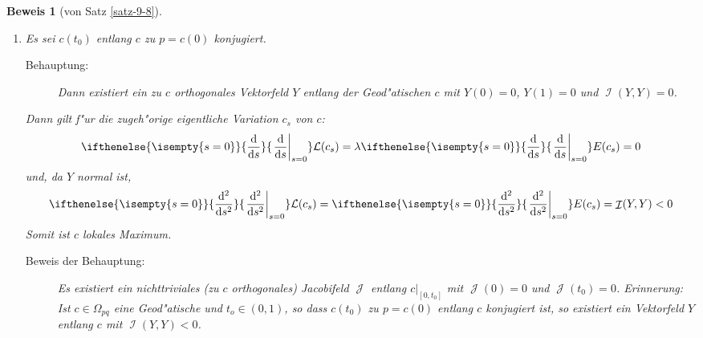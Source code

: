 \documentclass[paper=A4, twoside, chapterprefix=true, bibliography=totoc, headsepline]{scrbook}
\let\temp\phi{}
\let\phi\varphi{}
\let\varphi\temp{}
\let\temp\theta{}
\let\theta\vartheta{}
\let\vartheta\temp{}
\let\temp\epsilon{}
\let\epsilon\varepsilon{}
\let\varepsilon\temp{}
\let\temp\rho{}
\let\rho\varrho{}
\let\varrho\temp{}
\DeclareMathOperator{\calI}{\mathcal{I}}
\DeclareMathOperator{\calJ}{\mathcal{J}}
\newcommand{\dop}{\mathrm{d}}
\newcommand{\X}{\times}
\newcommand{\difffrac}[3][]{\ifthenelse{\isempty{#1}}{\frac{\dop #2}{\dop #3}}{\left. \frac{\dop #2}{\dop #3} \right|_{#1}}}
\theoremstyle{plain}
\theoremstyle{nonumberplain}
\newtheorem{bew}{Beweis}
\theoremstyle{empty}
\theoremstyle{break}
\begin{document}
\begin{bew}[von Satz \ref{satz-9-8}]
\begin{enumerate}[label=(\roman*),leftmargin=*,widest=ii]
\begin{center}
\end{center}
    Es sei $t_i$ eine Partition von $[0,1]$, so dass $\phi([t_{i-1},t_i]) \subseteq W_i$. Ist $c_s$ eine Variation von $c$, so kann $\epsilon > 0$ so gew"ahlt werden, dass
    \begin{align*}
      c_s \colon [t_{i-1},t_i]\X(-\epsilon,\epsilon) \to U_i = \exp_p(W_i)
    \end{align*}
    gilt. Dies definiert eine Variation $\psi_s$ von $\phi$ wie folgt:
    Ist $\psi_s$ bis $t_{i-1}$ definiert und gilt $\psi_s(t_{i-1}) \in W_i$, so setzt man $\psi_s(t) = \exp_p|_{W_i}^{-1}(c_s(t))$.
    Nach Lemma \ref{thm:lemma-9-10} gilt also
    \begin{align*}
      \mathcal L(\exp_p\circ \psi_s) = \mathcal L(c_s) \geq \mathcal L(c)
    \end{align*}
    f"ur alle $s$. Mit der Cauchy-Schwarz Ungleichung folgt dann:
    \begin{align*}
      E(c_s) \geq \frac{1}{2} \mathcal L(c_s)^2 \geq \frac{1}{2} \mathcal
      L(c)^2 = E(c)
    \end{align*}
  \item
    Es sei $c(t_0)$ entlang $c$ zu $p = c(0)$ konjugiert.
    
    \begin{description}\item[Behauptung:] Dann existiert ein zu $c$ orthogonales Vektorfeld $Y$ entlang der Geod"atischen $c$ mit $Y(0) = 0$, $Y(1) = 0$ und $\calI(Y,Y) = 0$.\end{description}
    Dann gilt f"ur die zugeh"orige eigentliche Variation $c_s$ von $c$:
    \begin{align*}
      \difffrac[s=0]{}{s}\mathcal L(c_s) = \lambda
      \difffrac[s=0]{}{s}E(c_s) = 0
    \end{align*}
    und, da $Y$ normal ist,
    \begin{align*}
      \difffrac[s=0]{^2}{s^2}\mathcal L(c_s) = \difffrac[s=0]{^2}{s^2}
      E(c_s) = \calI(Y,Y) < 0
    \end{align*}
    Somit ist $c$ lokales Maximum.
    \begin{description}\item[Beweis der Behauptung:]
      Es existiert ein nichttriviales (zu $c$ orthogonales) Jacobifeld $\calJ$ entlang $c|_{[0,t_0]}$ mit $\calJ(0) = 0$ und $\calJ(t_0) = 0$.
      \emph{Erinnerung:} Ist $c \in \Omega_{pq}$ eine Geod"atische und $t_o \in (0,1)$, so dass $c(t_0)$ zu $p = c(0)$ entlang $c$ konjugiert ist, so existiert ein Vektorfeld $Y$ entlang $c$ mit $\calI(Y,Y) < 0$.


\end{description}
\end{enumerate}
\end{bew}
\end{document}
